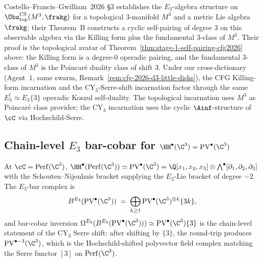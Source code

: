 \begin{remark}
\label{rem:cfg-self-dual-vs-stage-1-cfg2026}
Costello--Francis--Gwilliam~$2026$ \S$3$ establishes the
$E_3$-algebra structure on
$\Obs^{\mathrm{CS}}_{\mathrm{top}}(M^3, \frakg)$ for a topological
$3$-manifold $M^3$ and a metric Lie algebra $\frakg$; their Theorem~B
constructs a cyclic self-pairing of degree $3$ on this observable
algebra via the Killing form plus the fundamental $3$-class of $M^3$.
Their proof is the topological avatar of
Theorem~\textup{\ref{thm:stage-1-self-pairing-cfg2026}} above: the
Killing form is a degree-$0$ operadic pairing, and the fundamental
$3$-class of $M^3$ is the Poincar\'e duality class of shift $3$. Under
our cross-dictionary (Agent~$1$, same swarm,
Remark~\textup{\ref{rem:cfg-2026-d3-little-disks}}), the CFG Killing-form
incarnation and the CY$_3$-Serre-shift incarnation factor through the
same $E_3^! \simeq E_3\{3\}$ operadic Koszul self-duality. The
topological incarnation uses $M^3$ as Poincar\'e class provider; the
CY$_3$ incarnation uses the cyclic $\Ainf$-structure of $\cC$ via
Hochschild-Serre.
\end{remark}

\subsection*{Chain-level $E_3$ bar-cobar for $\HH^\bullet(\C^3) = \mathrm{PV}^\bullet(\C^3)$}

\begin{proposition}
\label{prop:e3-bar-cobar-c3-cfg2026}
\ClaimStatusProvedHere
At $\cC = \mathrm{Perf}(\C^3)$, $\HH^\bullet(\mathrm{Perf}(\C^3)) \simeq
\mathrm{PV}^\bullet(\C^3) = \Q[x_1, x_2, x_3] \otimes \bigwedge^\bullet[\partial_1, \partial_2, \partial_3]$
with the Schouten--Nijenhuis bracket supplying the $E_3$-Lie bracket of
degree $-2$. The $E_3$-bar complex is
\[
 B^{E_3}(\mathrm{PV}^\bullet(\C^3))
 \;=\; \bigoplus_{k \geq 1} \mathrm{PV}^\bullet(\C^3)^{\otimes k}\{3 k\},
\]
and bar-cobar inversion
$\Omega^{E_3}(B^{E_3}(\mathrm{PV}^\bullet(\C^3))) \simeq \mathrm{PV}^\bullet(\C^3)\{3\}$
is the chain-level statement of the CY$_3$ Serre shift: after shifting
by $\{3\}$, the round-trip produces
$\mathrm{PV}^{\bullet - 3}(\C^3)$, which is the Hochschild-shifted
polyvector field complex matching the Serre functor $[3]$ on
$\mathrm{Perf}(\C^3)$.
\end{proposition}

